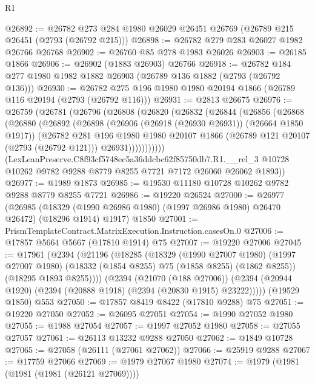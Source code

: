 \begin{lexlean}{R1}
\begin{coremodule}
@26892 := @26782 @273 @284 @1980 @26029 @26451 @26769 (@26789 @215 @26451 (@2793 (@26792 @215)))
@26898 := @26782 @279 @283 @26027 @1982 @26766 @26768
@26902 := @26760 @85 @278 @1983 @26026
@26903 := @26185 @1866
@26906 := @26902 (@1883 @26903) @26766
@26918 := @26782 @184 @277 @1980 @1982 @1882 @26903 (@26789 @136 @1882 (@2793 (@26792 @136)))
@26930 := @26782 @275 @196 @1980 @1980 @20194 @1866 (@26789 @116 @20194 (@2793 (@26792 @116)))
@26931 := @2813 @26675
@26976 := @26759
    (@26781
      (@26796
        (@26808
          (@26820
            (@26832
              (@26844
                (@26856
                  (@26868
                    (@26880
                      (@26892
                        (@26898
                          (@26906 (@26918 (@26930 @26931)) (@26664 @1850 @1917))
                          (@26782
                            @281
                            @196
                            @1980
                            @1980
                            @20107
                            @1866
                            (@26789 @121 @20107 (@2793 (@26792 @121)))
                            @26931)))))))))))
      (LexLeanPreserve.C8f93cf5748ec5a36ddcbc62f85750db7.R1.__rel_3
        @10728
        @10262
        @9782
        @9288
        @8779
        @8255
        @7721
        @7172
        @26060
        @26062
        @1893))
@26977 := @1989 @1873
@26985 := @19530 @11180 @10728 @10262 @9782 @9288 @8779 @8255 @7721
@26986 := @19220 @26524
@27000 := @26977
    (@26985 (@18329 (@1990 @26986 @1980) (@1997 @26986 @1980) @26470 @26472) (@18296 @1914) @1917)
    @1850
@27001 := PrismTemplateContract.MatrixExecution.Instruction.casesOn.{0}
@27006 := @17857 @5664 @5667 (@17810 @1914) @75
@27007 := @19220 @27006
@27045 := @17961
    (@2394
      (@21196
        (@18285
          (@18329
            (@1990 @27007 @1980)
            (@1997 @27007 @1980)
            (@18332 (@1854 @8255) @75 (@1858 @8255) (@1862 @8255))
            (@18295 @1893 @8255))))
      (@2394
        (@21070 (@188 @27006))
        (@2394 (@20944 @1920) (@2394 (@20888 @1918) (@2394 (@20830 @1915) @23222)))))
    (@19529 @1850)
    @553
@27050 := @17857 @8419 @8422 (@17810 @9288) @75
@27051 := @19220 @27050
@27052 := @26095 @27051
@27054 := @1990 @27052 @1980
@27055 := @1988 @27054
@27057 := @1997 @27052 @1980
@27058 := @27055 @27057
@27061 := @26113 @13232 @9288 @27050
@27062 := @1849 @10728
@27065 := @27058 (@26111 (@27061 @27062))
@27066 := @25919 @9288
@27067 := @17759 @27066
@27069 := @1979 @27067 @1980
@27074 := @1979 (@1981 (@1981 (@1981 (@26121 @27069))))

\end{coremodule}
\end{lexlean}
